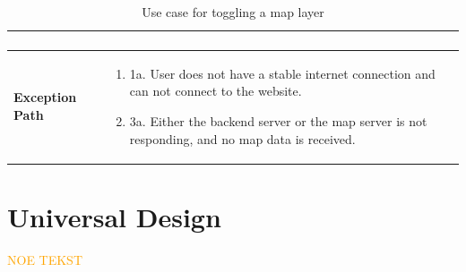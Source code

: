 \begin{table}[h]
\begin{tabularx}{\textwidth}{|l|X|}
\begin{enumerate}[label=,left=0pt]
        \end{enumerate} \\
        \hline
        \textbf{Exception Path} & 
        \begin{enumerate}[label=,left=0pt]
            \item 1a. User does not have a stable internet connection and can not connect to the website.
            \item 3a. Either the backend server or the map server is not responding, and no map data is received.
        \end{enumerate} \\
        \hline
    \end{tabularx}
    \caption[Use Case Specification: Toggle Map Layer]{Use case for toggling a map layer}
    \label{tab:use_case_toggle_layer}
\end{table}

\section{Universal Design}

\textcolor{orange}{NOE TEKST}

